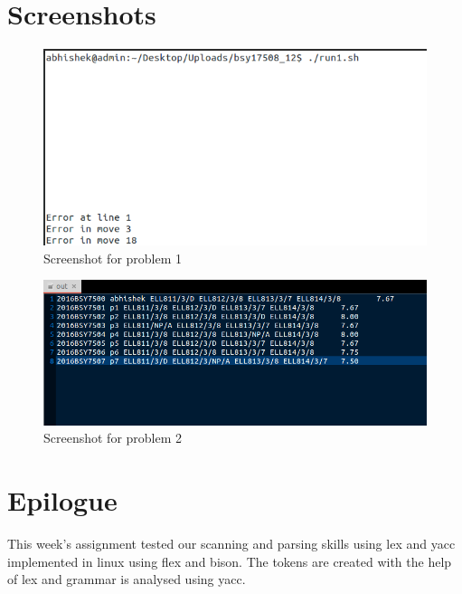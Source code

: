 \documentclass[11pt]{report}
\begin{document}
\section{Screenshots}
\begin{figure}[h!]
\centering
\includegraphics[scale=0.5, center]{images/screenshot1}
\caption{Screenshot for problem 1}
\end{figure}
\pagebreak
\begin{figure}[h!]
\centering
\includegraphics[scale=0.5, center]{images/screenshot2}
\caption{Screenshot for problem 2}
\end{figure}
\pagebreak
\section{Epilogue}
This week's assignment tested our scanning and parsing skills using lex and yacc implemented in linux using flex and bison. The tokens are created with the help of lex and grammar is analysed using yacc.
 

\nocite{*}
\end{document}
